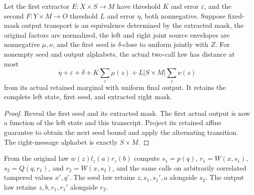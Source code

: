\begin{theorem}
  \label{thm:lowerbounds-algebraic-affine-alternation}
  \leanok
  Let the first extractor $E:X\times S\to M$ have threshold $K$ and
  error $\varepsilon$, and the second $F:Y\times M\to O$ threshold
  $L$ and error $\eta$, both nonnegative. Suppose fixed-mask output
  transport is an equivalence determined by the extracted mask, the
  original factors are normalized, the left and right joint source
  envelopes are nonnegative $\mu,\nu$, and the first seed is
  $\delta$-close to uniform jointly with $Z$. For nonempty seed and output
  alphabets, the actual two-call law has distance at most
  \[
    \eta+\varepsilon+\delta+K\sum_z\mu(z)
      +L|S\times M|\sum_z\nu(z)
  \]
  from its actual retained marginal with uniform final output. It retains
  the complete left state, first seed, and extracted right mask.
\end{theorem}
\begin{proof}
  \leanok
  Reveal the first seed and its extracted mask. The first actual output
  is now a function of the left state and this transcript. Project its
  retained affine guarantee to obtain the next seed bound and apply the
  alternating transition. The right-message alphabet is exactly $S\times M$.
\end{proof}

\begin{definition}
  \label{def:lowerbounds-algebraic-lookahead-laws}
  \leanok
  From the original law $w(z)l_z(a)r_z(b)$ compute
  $s_1=p(q)$, $r_1=W(x,s_1)$, $s_2=Q(q,r_1)$, and $r_2=W(x,s_2)$,
  and the same calls on arbitrarily correlated tampered values $x',q'$.
  The seed law retains $z,s_1,s_1',a$ alongside $s_2$.
  The output law retains $z,b,r_1,r_1'$ alongside $r_2$.
\end{definition}


